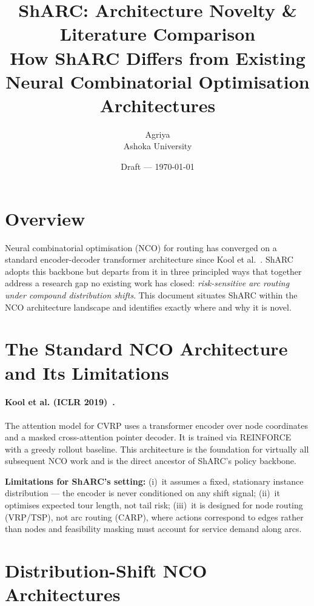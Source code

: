 \documentclass[11pt]{article}
\title{\textbf{ShARC: Architecture Novelty \& Literature Comparison}\\
\large How ShARC Differs from Existing Neural Combinatorial Optimisation Architectures}
\author{Agriya \\ \small Ashoka University}
\date{Draft --- \today}
\begin{document}
\maketitle

\section{Overview}

Neural combinatorial optimisation (NCO) for routing has converged on a
standard encoder-decoder transformer architecture since Kool et
al.~\cite{kool2019attention}.  ShARC adopts this backbone but departs from
it in three principled ways that together address a research gap no existing
work has closed: \emph{risk-sensitive arc routing under compound distribution
shifts}.  This document situates ShARC within the NCO architecture landscape
and identifies exactly where and why it is novel.

\section{The Standard NCO Architecture and Its Limitations}

\paragraph{Kool et al. (ICLR 2019)~\cite{kool2019attention}.}
The attention model for CVRP uses a transformer encoder over node coordinates
and a masked cross-attention pointer decoder.  It is trained via REINFORCE
with a greedy rollout baseline.  This architecture is the foundation for
virtually all subsequent NCO work and is the direct ancestor of ShARC's
policy backbone.

\textbf{Limitations for ShARC's setting:} (i)~it assumes a fixed,
stationary instance distribution — the encoder is never conditioned on any
shift signal; (ii)~it optimises expected tour length, not tail risk;
(iii)~it is designed for node routing (VRP/TSP), not arc routing (CARP),
where actions correspond to edges rather than nodes and feasibility masking
must account for service demand along arcs.

\section{Distribution-Shift NCO Architectures}
\end{document}
